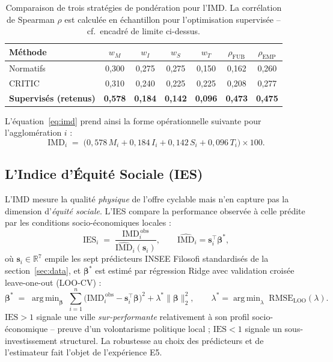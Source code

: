 \documentclass[11pt,a4paper]{article}
\newcommand{\IMD}{\mathrm{IMD}}
\newcommand{\IES}{\mathrm{IES}}
\DeclareMathOperator*{\argmin}{arg\,min}
\begin{document}
\begin{table}[H]
\centering
\caption{Comparaison de trois stratégies de pondération pour
l'IMD. La corrélation de Spearman $\rho$ est calculée en
échantillon pour l'optimisation supervisée -- cf.\ encadré de
limite ci-dessus.}
\label{tab:weights-comparison}
\small
\begin{tabular}{@{}lcccccc@{}}
\toprule
\textbf{Méthode} & $w_M$ & $w_I$ & $w_S$ & $w_T$ &
$\rho_{\text{FUB}}$ & $\rho_{\text{EMP}}$ \\
\midrule
Normatifs   & 0,300 & 0,275 & 0,275 & 0,150 & 0,162 & 0,260 \\
CRITIC \citep{Diakoulaki1995}
            & 0,310 & 0,240 & 0,225 & 0,225 & 0,208 & 0,277 \\
\textbf{Supervisés (retenus)}
            & \textbf{0,578} & \textbf{0,184} & \textbf{0,142}
            & \textbf{0,096}
            & \textbf{0,473} & \textbf{0,475} \\
\bottomrule
\end{tabular}
\end{table}

L'équation~\eqref{eq:imd} prend ainsi la forme opérationnelle
suivante pour l'agglomération $i$ :
\begin{equation}
    \IMD_i \;=\;
    \bigl(0{,}578\,M_i + 0{,}184\,I_i + 0{,}142\,S_i
          + 0{,}096\,T_i\bigr)\times 100.
    \label{eq:imd-op}
\end{equation}

\subsection{L'Indice d'Équité Sociale (IES)}

L'IMD mesure la qualité \emph{physique} de l'offre cyclable mais
n'en capture pas la dimension d'\emph{équité sociale}. L'IES
compare la performance observée à celle prédite par les
conditions socio-économiques locales :
\begin{equation}
    \IES_i \;=\;
    \frac{\IMD_i^{\,\text{obs}}}{\widehat{\IMD}_i(\mathbf{s}_i)},
    \qquad
    \widehat{\IMD}_i = \mathbf{s}_i^{\top}\boldsymbol{\beta}^{\ast},
    \label{eq:ies}
\end{equation}
où $\mathbf{s}_i \in \mathbb{R}^{7}$ empile les sept prédicteurs
INSEE Filosofi standardisés de la section~\ref{sec:data}, et
$\boldsymbol{\beta}^{\ast}$ est estimé par régression Ridge avec
validation croisée leave-one-out (LOO-CV) :
\begin{equation}
    \boldsymbol{\beta}^{\ast} \;=\;
    \argmin_{\boldsymbol{\beta}}\;
    \sum_{i=1}^{n}\bigl(\IMD_i^{\,\text{obs}}
                       - \mathbf{s}_i^{\top}\boldsymbol{\beta}\bigr)^{2}
    + \lambda^{\ast}\|\boldsymbol{\beta}\|_2^2,
    \qquad
    \lambda^{\ast} = \argmin_{\lambda}\;\mathrm{RMSE}_{\text{LOO}}
    (\lambda).
\end{equation}
$\IES > 1$ signale une ville \emph{sur-performante} relativement à
son profil socio-économique -- preuve d'un volontarisme politique
local ; $\IES < 1$ signale un sous-investissement structurel. La
robustesse au choix des prédicteurs et de l'estimateur fait
l'objet de l'expérience E5.
\end{document}
